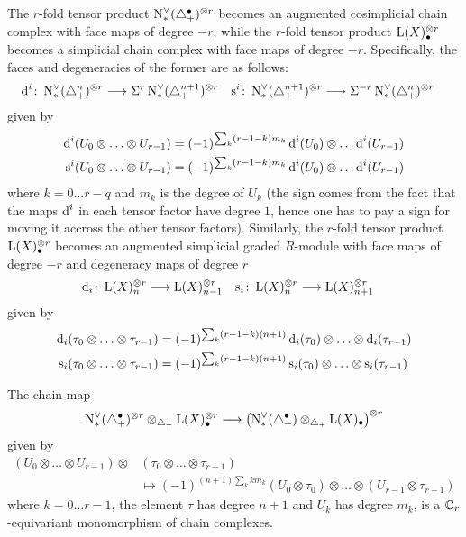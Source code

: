 The $r$-fold tensor product $\operatorname{N}^\vee_{*}(\triangle_{+}^\bullet)^{\otimes r}$ becomes an augmented cosimplicial chain complex with face maps of degree $-r$, while the $r$-fold tensor product $\operatorname{L}(X)_\bullet^{\otimes r}$ becomes a simplicial chain complex with face maps of degree $-r$. Specifically, the faces and degeneracies of the former are as follows:
\begin{align*}
	\operatorname{d}^i\colon \operatorname{N}^\vee_{*}(\triangle_{+}^n)^{\otimes r}&\longrightarrow \Sigma^{r}\operatorname{N}^\vee_{*}(\triangle_{+}^{n+1})^{\otimes r}
	&
	\operatorname{s}^i\colon \operatorname{N}^\vee_{*}(\triangle_{+}^{n+1})^{\otimes r}&\longrightarrow \Sigma^{-r}\operatorname{N}^\vee_{*}(\triangle_{+}^{n})^{\otimes r}
\end{align*}
given by
\begin{align*}
	\operatorname{d}^i(U_0\otimes \ldots\otimes U_{r-1}) &= (-1)^{\sum_k (r-1-k)m_k}\operatorname{d}^i(U_0)\otimes \ldots \operatorname{d}^i(U_{r-1})
	\\
	\operatorname{s}^i(U_0\otimes \ldots\otimes U_{r-1}) &= (-1)^{\sum_k (r-1-k)m_k}\operatorname{d}^i(U_0)\otimes \ldots \operatorname{d}^i(U_{r-1})
\end{align*}	
where $k = 0\ldots r-q$ and $m_k$ is the degree of $U_k$ (the sign comes from the fact that the maps $\operatorname{d}^i$ in each tensor factor have degree $1$, hence one has to pay a sign for moving it accross the other tensor factors). Similarly, the $r$-fold tensor product $\operatorname{L}(X)^{\otimes r}_{\bullet}$ becomes an augmented simplicial graded $R$-module with face maps of degree $-r$ and degeneracy maps of degree $r$
\begin{align*}
	\operatorname{d}_i\colon \operatorname{L}(X)_n^{\otimes r} &\longrightarrow \operatorname{L}(X)_{n-1}^{\otimes r}
	&
	\operatorname{s}_i\colon \operatorname{L}(X)_n^{\otimes r} &\longrightarrow \operatorname{L}(X)_{n+1}^{\otimes r}
\end{align*}
given by 
\begin{align*}
	\operatorname{d}_i(\tau_0\otimes \ldots\otimes \tau_{r-1}) &= (-1)^{\sum_k (r-1-k)(n+1)} \operatorname{d}_i(\tau_0)\otimes \ldots \otimes \operatorname{d}_i(\tau_{r-1})
\\
	\operatorname{s}_i(\tau_0\otimes \ldots\otimes \tau_{r-1}) &= (-1)^{\sum_k (r-1-k)(n+1)} \operatorname{s}_i(\tau_0)\otimes \ldots \otimes \operatorname{s}_i(\tau_{r-1})
	\end{align*}
\begin{lemma}\label{lemma:3}
	The chain map
	\[\operatorname{N}^\vee_{*}(\triangle_{+}^\bullet)^{\otimes r}\otimes_{\triangle_{+}} \operatorname{L}(X)_\bullet^{\otimes r}\longrightarrow \left(\operatorname{N}^\vee_{*}(\triangle_{+}^\bullet)\otimes_{\triangle_{+}} \operatorname{L}(X)_\bullet\right)^{\otimes r}\]
	given by
	\begin{align*}
		(U_0\otimes \ldots\otimes U_{r-1})\otimes &(\tau_0\otimes\ldots\otimes \tau_{r-1})
	\\	
  &\mapsto (-1)^{(n+1)\sum_{k} km_k}(U_0\otimes\tau_0)\otimes \ldots\otimes (U_{r-1}\otimes \tau_{r-1})
	\end{align*}
where $k=0\ldots r-1$, the element $\tau$ has degree $n+1$ and $U_k$ has degree $m_k$, is a $\mathbb{C}_r$-equivariant monomorphism of chain complexes. 
\end{lemma}
